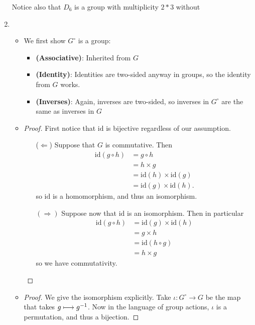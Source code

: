 \documentclass[12pt, twosided]{article}
\begin{document}
\begin{enumerate}
  Notice also that \(D_6\) is a group with multiplicity \(2 * 3\) without 
\item
  \begin{itemize}
  \item We first show \(G^\circ\) is a group:
    \begin{itemize}
    \item \textbf{(Associative)}: Inherited from \(G\)
    \item \textbf{(Identity)}: Identities are two-sided anyway in groups, so the identity from \(G\) works.
    \item \textbf{(Inverses)}: Again, inverses are two-sided, so inverses in \(G^\circ\) are the same as inverses in \(G\)
    \end{itemize}
  \item
    \begin{proof}
      First notice that \(\mathrm{id}\) is bijective regardless of our assumption.
      \begin{itemize}
      \item [(\(\Leftarrow\))] Suppose that \(G\) is commutative. Then
        \begin{align*}
          \mathrm{id}(g \circ h) &= g \circ h \\
                                 &= h \times g \\
                                 &= \mathrm{id}(h) \times \mathrm{id}(g) \\
                                 &= \mathrm{id}(g) \times \mathrm{id}(h).
        \end{align*}
        so \(\mathrm{id}\) is a homomorphism, and thus an isomorphism. \partdone
      \item [\((\Rightarrow)\)] Suppose now that \(\mathrm{id}\) is an isomorphism. Then in particular
        \begin{align*}
          \mathrm{id}(g \circ h) &= \mathrm{id}(g) \times \mathrm{id}(h) \\
                                 &= g \times h \\
                                 &= \mathrm{id}(h \circ g) \\
                                 &= h \times g
        \end{align*}
        so we have commutativity.
      \end{itemize}
    \end{proof}
  \item
    \begin{proof}
      We give the isomorphism explicitly. Take \(\iota: G^\circ \to G\) be the map that takes \(g \longmapsto g^{-1}\). Now in the language of group actions, \(\iota\) is a permutation, and thus a bijection. \partdone
      

\end{proof}
\end{itemize}
\end{enumerate}
\end{document}

